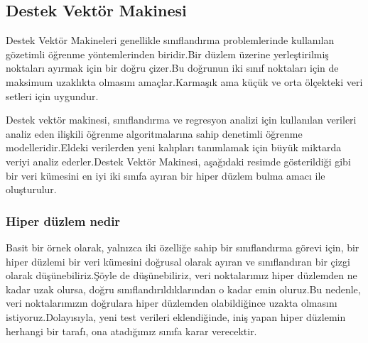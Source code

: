 \documentclass[12pt,twoside]{deuthesis}
\begin{document}
\hypertarget{destek-vektuxf6r-makinesi}{%
\subsection{Destek Vektör Makinesi}\label{destek-vektuxf6r-makinesi}}

Destek Vektör Makineleri genellikle sınıflandırma problemlerinde kullanılan gözetimli öğrenme yöntemlerinden biridir.Bir düzlem üzerine yerleştirilmiş noktaları ayırmak için bir doğru çizer.Bu doğrunun iki sınıf noktaları için de maksimum uzaklıkta olmasını amaçlar.Karmaşık ama küçük ve orta ölçekteki veri setleri için uygundur.

Destek vektör makinesi, sınıflandırma ve regresyon analizi için kullanılan verileri analiz eden ilişkili öğrenme algoritmalarına sahip denetimli öğrenme modelleridir.Eldeki verilerden yeni kalıpları tanımlamak için büyük miktarda veriyi analiz ederler.Destek Vektör Makinesi, aşağıdaki resimde gösterildiği gibi bir veri kümesini en iyi iki sınıfa ayıran bir hiper düzlem bulma amacı ile oluşturulur.

\hypertarget{hiper-duxfczlem-nedir}{%
\subsubsection{Hiper düzlem nedir}\label{hiper-duxfczlem-nedir}}

Basit bir örnek olarak, yalnızca iki özelliğe sahip bir sınıflandırma görevi için, bir hiper düzlemi bir veri kümesini doğrusal olarak ayıran ve sınıflandıran bir çizgi olarak düşünebiliriz.Şöyle de düşünebiliriz, veri noktalarımız hiper düzlemden ne kadar uzak olursa, doğru sınıflandırıldıklarından o kadar emin oluruz.Bu nedenle, veri noktalarımızın doğrulara hiper düzlemden olabildiğince uzakta olmasını istiyoruz.Dolayısıyla, yeni test verileri eklendiğinde, iniş yapan hiper düzlemin herhangi bir tarafı, ona atadığımız sınıfa karar verecektir.

~
\end{document}
